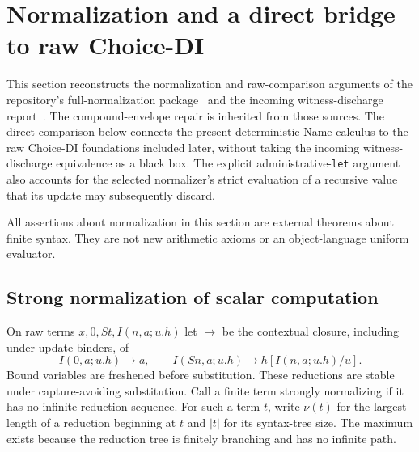
\section{Normalization and a direct bridge to raw Choice-DI}
\label{sec:normalization-bridge}
\label{sec:canonical-bridge}

This section reconstructs the normalization and raw-comparison arguments
of the repository's full-normalization package~\cite{normalization} and the
incoming witness-discharge report~\cite{witness}. The
compound-envelope repair is inherited from those sources. The direct
comparison below connects the present deterministic Name calculus to the
raw Choice-DI foundations included later, without taking the incoming
witness-discharge equivalence as a black box. The explicit
administrative-\texttt{let} argument also accounts for the selected
normalizer's strict evaluation of a recursive value that its update may
subsequently discard.

All assertions about normalization in this section are external theorems
about finite syntax. They are not new arithmetic axioms or an
object-language uniform evaluator.

\subsection{Strong normalization of scalar computation}

On raw terms $x,0,St,I(n,a;u.h)$ let $\longrightarrow$ be the contextual
closure, including under update binders, of
\[
 I(0,a;u.h)\longrightarrow a,\qquad
 I(Sn,a;u.h)\longrightarrow h[I(n,a;u.h)/u].
 \tag{Raw computation}\label{eq:nb-reduction}
\]
Bound variables are freshened before substitution. These reductions are
stable under capture-avoiding substitution. Call a finite term strongly
normalizing if it has no infinite reduction sequence. For such a term $t$,
write $\nu(t)$ for the largest length of a reduction beginning at $t$ and
$|t|$ for its syntax-tree size. The maximum exists because the reduction
tree is finitely branching and has no infinite path.

